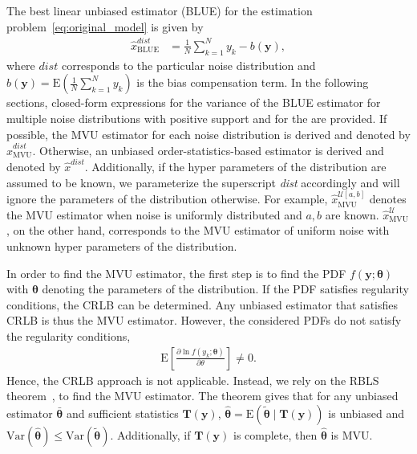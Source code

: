 \documentclass[journal]{IEEEtran}
\newcommand{\E}{\mathrm{E}}
\newcommand{\Var}{\mathrm{Var}}
\begin{document}
The best linear unbiased estimator (BLUE) for the estimation problem~\eqref{eq:original_model} is given by
%
%
\begin{align}
\hat{x}_{\mathrm{BLUE}}^{dist} &= \frac{1}{N}\sum_{k=1}^N y_k - b(\bm{y}),
\label{eq:mean_estimator}
\end{align}
%
%
where $dist$ corresponds to the particular noise distribution and $b(\bm{y})=\mathrm{E}(\frac{1}{N}\sum_{k=1}^N y_k)$ is the bias compensation term. In the following sections, closed-form expressions for the variance of the BLUE estimator for multiple noise distributions with positive support and for the are provided.  If possible, the MVU estimator for each noise distribution is derived and denoted by $\hat{x}_{\mathrm{MVU}}^{dist}$. Otherwise, an unbiased order-statistics-based estimator is derived and denoted by $\hat{x}^{dist}$. Additionally, if the hyper parameters of the distribution are assumed to be known, we parameterize the superscript {\em dist} accordingly and will ignore the parameters of the distribution otherwise. For example, $\hat{x}^{\mathcal{U}[a,b]}_{\mathrm{MVU}}$ denotes the MVU estimator when noise is uniformly distributed and $a,b$  are known. $\hat{x}^{\mathcal{U}}_{\mathrm{MVU}}$, on the other hand, corresponds to the MVU estimator of uniform noise with unknown hyper parameters of the distribution.

In order to find the MVU estimator, the first step is to find the PDF $f(\bm{y};\bm{\theta})$ with $\bm{\theta}$ denoting the parameters of the distribution. If the PDF satisfies regularity conditions, the CRLB can be determined. Any unbiased estimator that satisfies CRLB is thus the MVU estimator. However, the considered PDFs do not satisfy the regularity conditions,
%
%
\begin{align}
\E\left[\frac{\partial\ln f(y_k;\bm{\theta})}{\partial \theta}\right]\neq0.
\end{align}
%
%
Hence, the CRLB approach is not applicable. Instead, we rely on the RBLS theorem~\cite{article:IJS_lehmann_1,article:IJS_lehmann_2,book:ET_kay_93}, to find the MVU estimator. The theorem gives that for any unbiased estimator $\bar{\bm{\theta}}$ and sufficient statistics $\bm{T}(\bm{y})$, $\hat{\bm{\theta}}=\E(\tilde{\bm{\theta}}\mid\bm{T}(\bm{y}))$ is unbiased and $\Var(\hat{\bm{\theta}})\leq\Var(\tilde{\bm{\theta}})$. Additionally, if $\bm{T}(\bm{y})$ is complete, then $\hat{\bm{\theta}}$ is MVU.
\end{document}
